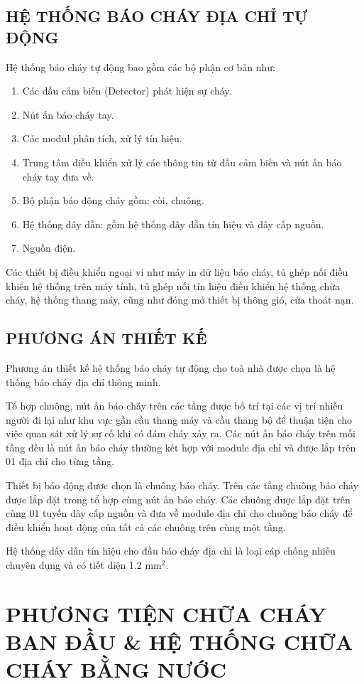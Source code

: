 \subsection{HỆ THỐNG BÁO CHÁY ĐỊA CHỈ TỰ ĐỘNG}
Hệ thống báo cháy tự động bao gồm các bộ phận cơ bản như:
\begin{enumerate}
	\item Các đầu cảm biến (Detector) phát hiện sự cháy.
	\item Nút ấn báo cháy tay.
	\item Các modul phân tích, xử lý tín hiệu.
	\item Trung tâm điều khiển xử lý các thông tin từ đầu cảm biến và nút ấn báo cháy tay đưa về.
	\item Bộ phận báo động cháy gồm: còi, chuông.
	\item Hệ thống dây dẫn: gồm hệ thống dây dẫn tín hiệu và dây cấp nguồn.
	\item Nguồn điện.
\end{enumerate}

Các thiết bị điều khiển ngoại vi như máy in dữ liệu báo cháy, tủ ghép nối điều khiển hệ thống trên máy tính, tủ ghép nối tín hiệu điều khiển hệ thống chữa cháy, hệ thống thang máy, cũng như đóng mở thiết bị thông gió, cửa thoát nạn.

\subsection{PHƯƠNG ÁN THIẾT KẾ}
Phương án thiết kế hệ thống báo cháy tự động cho toà nhà được chọn là hệ thống báo cháy địa chỉ thông minh.

Tổ hợp chuông, nút ấn báo cháy trên các tầng được bố trí tại các vị trí nhiều người đi lại như khu vực gần cầu thang máy và cầu thang bộ để thuận tiện cho việc quan sát xử lý sự cố khi có đám cháy xảy ra. Các nút ấn báo cháy trên mỗi tầng đều là nút ấn báo cháy thường kết hợp với module địa chỉ và được lắp trên 01 địa chỉ cho từng tầng.

Thiết bị báo động được chọn là chuông báo cháy. Trên các tầng chuông báo cháy được lắp đặt trong tổ hợp cùng nút ấn báo cháy. Các chuông được lắp đặt trên cùng 01 tuyến dây cấp nguồn và đưa về module địa chỉ cho chuông báo cháy để điều khiển hoạt
động của tất cả các chuông trên cùng một tầng.

Hệ thống dây dẫn tín hiệu cho đầu báo cháy địa chỉ là loại cáp chống nhiễu chuyên dụng và có tiết diện 1.2 mm$^2$.

\section{PHƯƠNG TIỆN CHỮA CHÁY BAN ĐẦU \& HỆ THỐNG CHỮA CHÁY BẰNG NƯỚC}
